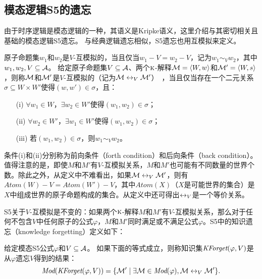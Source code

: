 \subsection{模态逻辑S5的遗忘}\label{chapter:sub:s5forgetting}

由于时序逻辑是模态逻辑的一种，其语义是Kripke语义，这里介绍与其密切相关且基础的模态逻辑S5遗忘。
与经典逻辑遗忘相似，S5遗忘也用互模拟来定义。

原子命题集$w_1$和$w_2$是$V$-互模拟的，当且仅当$w_1 -V = w_2 -V$，记为$w_1 \sim_V w_2$，其中$w_1, w_2, V \subseteq {\cal A}$。
给定原子命题集$V\subseteq {\cal A}$、两个$\textsc{k}$-解释${\cal M}={\langle{W,w}\rangle}$和${\cal M}'={\langle{W,s}\rangle}$，则称${\cal M}$和${\cal M}'$是$V$-互模拟的（记为${\cal M} \leftrightarrow_{V} {\cal M}'$）~\cite{Zhang2008Properties}，当且仅当存在一个二元关系$\sigma \subseteq W \times W'$使得$(w,w') \in \sigma$，且：
\begin{itemize}
	\item[(i)] $\forall w_1 \in W$，$\exists w_2\in W'$使得$(w_1, w_2) \in \sigma$；
	\item[(ii)] $\forall w_2 \in W'$，$\exists w_1\in W'$使得$(w_1, w_2) \in \sigma$；
	\item[(iii)] 若$(w_1, w_2) \in \sigma$，则$w_1\sim_V w_2$。
\end{itemize}

条件(i)和(ii)分别称为前向条件（forth condition）和后向条件（back condition）。值得注意的是，即使$M$和$M'$有$V$-互模拟关系，$M$和$M'$也可能有不同数量的世界个数。除此之外，从定义中不难看出，如果${\cal M} \leftrightarrow_{V} {\cal M}'$，则有$Atom(W)-V=Atom(W' )-V$，其中$Atom(X)$（$X$是可能世界的集合）是$X$中组成世界的原子命题构成的集合。从定义中还可得出$\leftrightarrow_V$是一个等价关系。

S5关于$V$-互模拟是不变的：如果两个$\textsc{k}$-解释$M$和$M'$有$V$-互模拟关系，那么对于任何不包含$V$中任何原子的公式$\varphi$，$M$和$M'$同时满足或不满足公式$\varphi$。S5中的知识遗忘（knowledge forgetting）定义如下\cite{Zhang2008Properties}：

\begin{definition}\label{def:s5forgetting}
	给定模态S5公式$\varphi$和$V\subseteq {\cal A}$。
	如果下面的等式成立，则称知识集$\textit{KForget}(\varphi,V)$是从$\varphi$遗忘$V$得到的结果：
	$$\textit{Mod}(\textit{KForget}(\varphi, V)) = \{{\cal M}' \mid \exists {\cal M} \in \textit{Mod}(\varphi), {\cal M} \leftrightarrow_V {\cal M}'\}.$$
\end{definition}

